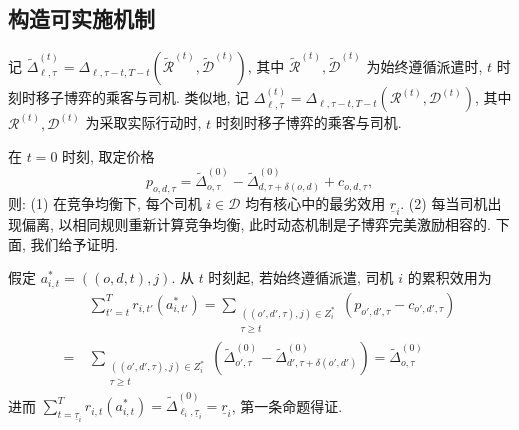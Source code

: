 \documentclass[10pt,twocolumn]{article}
\begin{document}
\subsection{构造可实施机制}

记 $\tilde{\Delta}^{(t)}_{\ell, \tau} = \Delta_{\ell, \tau-t, T-t}(\tilde{\mathcal{R}}^{(t)},\tilde{\mathcal{D}}^{(t)})$, 其中 $\tilde{\mathcal{R}}^{(t)},\tilde{\mathcal{D}}^{(t)}$ 为始终遵循派遣时, $t$ 时刻时移子博弈的乘客与司机. 类似地, 记 $\Delta^{(t)}_{\ell, \tau} = \Delta_{\ell, \tau-t, T-t}(\mathcal{R}^{(t)},\mathcal{D}^{(t)})$, 其中 $\mathcal{R}^{(t)},\mathcal{D}^{(t)}$ 为采取实际行动时, $t$ 时刻时移子博弈的乘客与司机.

在 $t=0$ 时刻, 取定价格 $$p_{o,d,\tau} = \tilde{\Delta}^{(0)}_{o,\tau} - \tilde{\Delta}^{(0)}_{d,\tau+\delta(o,d)} + c_{o,d,\tau},$$ 则: (1) 在竞争均衡下, 每个司机 $i\in\mathcal{D}$ 均有核心中的最劣效用 $\underline{r}_i$. (2) 每当司机出现偏离, 以相同规则重新计算竞争均衡, 此时动态机制是子博弈完美激励相容的. 下面, 我们给予证明.

假定 $a^*_{i,t}=((o,d,t),j)$. 从 $t$ 时刻起, 若始终遵循派遣, 司机 $i$ 的累积效用为
\begin{align*}
      & \sum_{t'=t}^T r_{i,t'}(a^*_{i,t'}) = \sum_{\substack{((o',d',\tau),j)\in Z^*_{i} \\ \tau \ge t}} (p_{o',d',\tau} - c_{o',d',\tau}) \\
  =\  & \sum_{\substack{((o',d',\tau),j)\in Z^*_{i}                                      \\ \tau \ge t}}\left(\tilde{\Delta}^{(0)}_{o',\tau} - \tilde{\Delta}^{(0)}_{d',\tau+\delta(o',d')}\right) = \tilde{\Delta}^{(0)}_{o,\tau}
\end{align*}
进而 $\sum_{t=\underline{\tau}_i}^T r_{i,t}(a^*_{i,t}) = \tilde{\Delta}^{(0)}_{\ell_i,\underline{\tau}_i} = \underline{r}_i$, 第一条命题得证.
\end{document}
